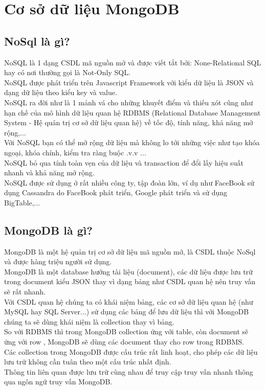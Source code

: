 \section{Cơ sở dữ liệu MongoDB}
\subsection{NoSql là gì?}
NoSQL là 1 dạng CSDL mã nguồn mở và được viết tắt bởi: None-Relational SQL hay có nơi thường gọi là Not-Only SQL.\\
NoSQL được phát triển trên Javascript Framework với kiểu dữ liệu là JSON và dạng dữ liệu theo kiểu key và value.\\
NoSQL ra đời như là 1 mảnh vá cho những khuyết điểm và thiếu xót cũng như hạn chế của mô hình dữ liệu quan hệ RDBMS (Relational Database Management System - Hệ quản trị cơ sở dữ liệu quan hệ) về tốc độ, tính năng, khả năng mở rộng,...\\
Với NoSQL bạn có thể mở rộng dữ liệu mà không lo tới những việc như tạo khóa ngoại, khóa chính, kiểm tra ràng buộc .v.v ...\\
NoSQL bỏ qua tính toàn vẹn của dữ liệu và transaction để đổi lấy hiệu suất nhanh và khả năng mở rộng.\\
NoSQL được sử dụng ở rất nhiều công ty, tập đoàn lớn, ví dụ như FaceBook sử dụng Cassandra do FaceBook phát triển, Google phát triển và sử dụng BigTable,...

\subsection{MongoDB là gì?}
\label{ref{fig2_9}}
MongoDB là một hệ quản trị cơ sở dữ liệu mã nguồn mở, là CSDL thuộc NoSql và được hàng triệu người sử dụng.\\
MongoDB là một database hướng tài liệu (document), các dữ liệu được lưu trữ trong document kiểu JSON thay vì dạng bảng như CSDL quan hệ nên truy vấn sẽ rất nhanh.\\
Với CSDL quan hệ chúng ta có khái niệm bảng, các cơ sở dữ liệu quan hệ (như MySQL hay SQL Server...) sử dụng các bảng để lưu dữ liệu thì với MongoDB chúng ta sẽ dùng khái niệm là collection thay vì bảng.\\
So với RDBMS thì trong MongoDB collection ứng với table, còn document sẽ ứng với row , MongoDB sẽ dùng các document thay cho row trong RDBMS.\\
Các collection trong MongoDB được cấu trúc rất linh hoạt, cho phép các dữ liệu lưu trữ không cần tuân theo một cấu trúc nhất định.\\
Thông tin liên quan được lưu trữ cùng nhau để truy cập truy vấn nhanh thông qua ngôn ngữ truy vấn MongoDB.\\

